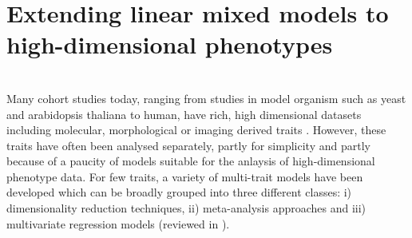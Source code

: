 \chapter{Extending linear mixed models to high-dimensional phenotypes}
\\
Many cohort studies today, ranging from studies in model organism such as yeast and arabidopsis thaliana to human, have rich, high dimensional datasets including molecular, morphological or imaging derived traits \citep{Bloom2013,Atwell2010,Astle2009,Shaffer2016,Stein2010}. However, these traits have often been analysed separately,  partly for simplicity and partly because of a paucity of models suitable for the anlaysis of high-dimensional phenotype data. For few traits, a variety of multi-trait models have been developed which can be broadly grouped into three different classes: i) dimensionality reduction techniques, ii) meta-analysis approaches and iii) multivariate regression models (reviewed in \citep{Shriner2012,Yang2012}). 

